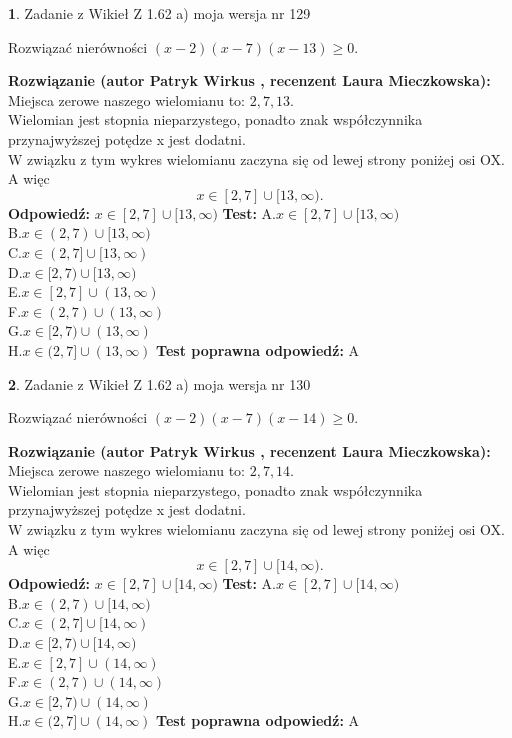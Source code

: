 \documentclass[12pt, a4paper]{article}
\theoremstyle{definition} %
\newtheorem{zad}{}
\newcommand{\zadStart}[1]{\begin{zad}#1\newline}
\newcommand{\zadStop}{\end{zad}}
\newcommand{\rozwStart}[2]{\noindent \textbf{Rozwiązanie (autor #1 , recenzent #2): }\newline}
\newcommand{\rozwStop}{\newline}
\newcommand{\odpStart}{\noindent \textbf{Odpowiedź:}\newline}
\newcommand{\odpStop}{\newline}
\newcommand{\testStart}{\noindent \textbf{Test:}\newline}
\newcommand{\testStop}{\newline}
\newcommand{\kluczStart}{\noindent \textbf{Test poprawna odpowiedź:}\newline}
\newcommand{\kluczStop}{\newline}
\begin{document}
\zadStart{Zadanie z Wikieł Z 1.62 a) moja wersja nr 129}

Rozwiązać nierówności $(x-2)(x-7)(x-13)\ge0$.
\zadStop
\rozwStart{Patryk Wirkus}{Laura Mieczkowska}
Miejsca zerowe naszego wielomianu to: $2, 7, 13$.\\
Wielomian jest stopnia nieparzystego, ponadto znak współczynnika przy\linebreak najwyższej potędze x jest dodatni.\\ W związku z tym wykres wielomianu zaczyna się od lewej strony poniżej osi OX. A więc $$x \in [2,7] \cup [13,\infty).$$
\rozwStop
\odpStart
$x \in [2,7] \cup [13,\infty)$
\odpStop
\testStart
A.$x \in [2,7] \cup [13,\infty)$\\
B.$x \in (2,7) \cup [13,\infty)$\\
C.$x \in (2,7] \cup [13,\infty)$\\
D.$x \in [2,7) \cup [13,\infty)$\\
E.$x \in [2,7] \cup (13,\infty)$\\
F.$x \in (2,7) \cup (13,\infty)$\\
G.$x \in [2,7) \cup (13,\infty)$\\
H.$x \in (2,7] \cup (13,\infty)$
\testStop
\kluczStart
A
\kluczStop



\zadStart{Zadanie z Wikieł Z 1.62 a) moja wersja nr 130}

Rozwiązać nierówności $(x-2)(x-7)(x-14)\ge0$.
\zadStop
\rozwStart{Patryk Wirkus}{Laura Mieczkowska}
Miejsca zerowe naszego wielomianu to: $2, 7, 14$.\\
Wielomian jest stopnia nieparzystego, ponadto znak współczynnika przy\linebreak najwyższej potędze x jest dodatni.\\ W związku z tym wykres wielomianu zaczyna się od lewej strony poniżej osi OX. A więc $$x \in [2,7] \cup [14,\infty).$$
\rozwStop
\odpStart
$x \in [2,7] \cup [14,\infty)$
\odpStop
\testStart
A.$x \in [2,7] \cup [14,\infty)$\\
B.$x \in (2,7) \cup [14,\infty)$\\
C.$x \in (2,7] \cup [14,\infty)$\\
D.$x \in [2,7) \cup [14,\infty)$\\
E.$x \in [2,7] \cup (14,\infty)$\\
F.$x \in (2,7) \cup (14,\infty)$\\
G.$x \in [2,7) \cup (14,\infty)$\\
H.$x \in (2,7] \cup (14,\infty)$
\testStop
\kluczStart
A
\kluczStop
\end{document}
